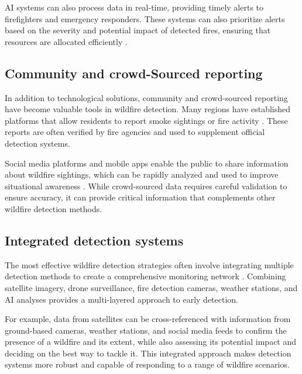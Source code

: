 \documentclass[
  12 pt,
]{Nemilov}
\begin{document}
AI systems can also process data in real-time, providing timely alerts to firefighters and emergency responders. These systems can also prioritize alerts based on the severity and potential impact of detected fires, ensuring that resources are allocated efficiently \citep{bot2022systematic}.

\subsection{Community and crowd-Sourced reporting}\label{community-and-crowd-sourced-reporting}

In addition to technological solutions, community and crowd-sourced reporting have become valuable tools in wildfire detection. Many regions have established platforms that allow residents to report smoke sightings or fire activity \citep{bogdos2019crowd, zhong2016real}. These reports are often verified by fire agencies and used to supplement official detection systems.

Social media platforms and mobile apps enable the public to share information about wildfire sightings, which can be rapidly analyzed and used to improve situational awareness \citep{slavkovikj2014review}. While crowd-sourced data requires careful validation to ensure accuracy, it can provide critical information that complements other wildfire detection methods.

\subsection{Integrated detection systems}\label{integrated-detection-systems}

The most effective wildfire detection strategies often involve integrating multiple detection methods to create a comprehensive monitoring network \citep{ambrosia1998integration}. Combining satellite imagery, drone surveillance, fire detection cameras, weather stations, and AI analyses provides a multi-layered approach to early detection.

For example, data from satellites can be cross-referenced with information from ground-based cameras, weather stations, and social media feeds to confirm the presence of a wildfire and its extent, while also assessing its potential impact and deciding on the best way to tackle it. This integrated approach makes detection systems more robust and capable of responding to a range of wildfire scenarios.
\end{document}
